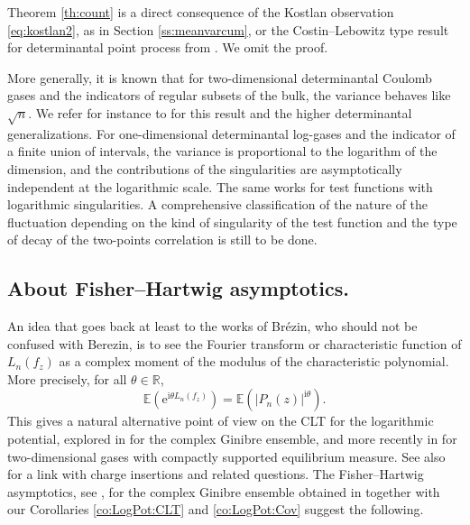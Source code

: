 \documentclass[10pt,reqno]{amsart}
\numberwithin{equation}{section}
\numberwithin{figure}{section}
\theoremstyle{plain}
\newcommand{\<}{\langle}
\renewcommand{\>}{\rangle}
\begin{document}
Theorem \ref{th:count} is a direct consequence of the Kostlan observation \eqref{eq:kostlan2}, as in Section \ref{ss:meanvarcum}, or the Costin--Lebowitz type result for determinantal point process from \cite{MR1894104}.  We omit the proof. 

More generally, it is known that for two-dimensional determinantal Coulomb gases and the indicators of regular subsets of the bulk, the variance behaves like $\sqrt{n}$. We refer for instance to \cite[Th.~1.6]{LaurentBenoit} for this result and the higher determinantal generalizations. For one-dimensional determinantal log-gases and the indicator of a finite union of intervals, the variance is proportional to the logarithm of the dimension, and the contributions of the singularities are asymptotically independent at the logarithmic scale. The same works for test functions with logarithmic singularities. A comprehensive classification of the nature of the fluctuation depending on the kind of singularity of the test function and the type of decay of the two-points correlation is still to be done. 
%
%
%

\subsection{About Fisher--Hartwig asymptotics.}
An idea that goes back at least to the works of Brézin, who should not be confused with Berezin, is to see the Fourier transform or characteristic function of $L_n(f_z)$ as a complex moment of the modulus of the characteristic polynomial. More precisely, for all $\theta\in\mathbb{R}$,
\begin{equation}
    \mathbb{E}(\mathrm{e}^{\mathrm{i}\theta L_n(f_z)})
    =\mathbb{E}(|P_n(z)|^{\mathrm{i}\theta}).    
\end{equation}
This gives a natural alternative point of view on the CLT for the logarithmic
potential, explored in \cite{MR3946715} for the complex Ginibre ensemble, and
more recently in \cite{bourgadeetal} for two-dimensional gases with compactly
supported equilibrium measure. See also
\cite{byun2025propertiesonecomponentcoulombgas,byun2025orthogonalpolynomialssphericalensemble,byun2026freeenergyexpansiondeterminantal}
for a link with charge insertions and related questions. The Fisher--Hartwig
asymptotics, see \cite{fisher-hartwig}, for the complex Ginibre ensemble
obtained in \cite{MR3946715} together with our Corollaries \ref{co:LogPot:CLT} and
\ref{co:LogPot:Cov} suggest the following.
\end{document}
